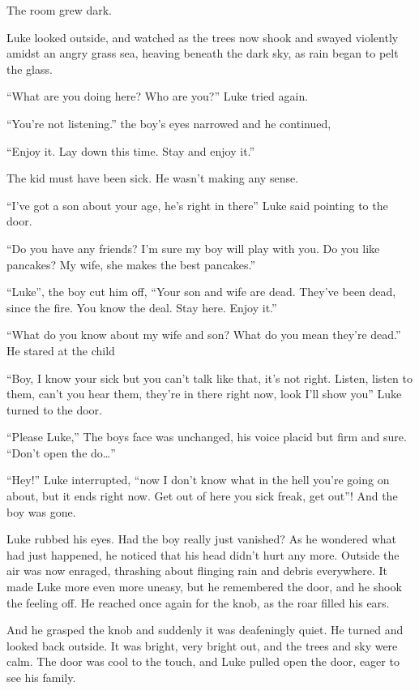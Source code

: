 The room grew dark.

Luke looked outside, and watched as the trees now shook and swayed
violently amidst an angry grass sea, heaving beneath the dark sky,
as rain began to pelt the glass.

``What are you doing here? Who are you?'' Luke tried
again.

``You're not listening.'' the boy's eyes
narrowed and he continued,

``Enjoy it. Lay down this time. Stay and enjoy
it.''



The kid must have been sick. He wasn't making any
sense.

``I've got a son about your age, he's right in
there'' Luke said pointing to the door.

``Do you have any friends? I'm sure my boy will play
with you. Do you like pancakes? My wife, she makes the best
pancakes.''

``Luke'', the boy cut him off, ``Your son and wife
are dead. They've been dead, since the fire. You know the
deal. Stay here. Enjoy it.''

``What do you know about my wife and son? What do you mean
they're dead.'' He stared at the child

``Boy, I know your sick but you can't talk like that,
it's not right. Listen, listen to them, can't you hear
them, they're in there right now, look I'll show
you'' Luke turned to the door.

``Please Luke,'' The boys face was unchanged, his voice
placid but firm and sure. ``Don't open the
do{\ldots}''

``Hey!'' Luke interrupted, ``now I don't know
what in the hell you're going on about, but it ends right
now. Get out of here you sick freak, get out''! And the boy
was gone.

Luke rubbed his eyes. Had the boy really just vanished? As he
wondered what had just happened, he noticed that his head
didn't hurt any more. Outside the air was now enraged,
thrashing about flinging rain and debris everywhere. It made Luke
more even more uneasy, but he remembered the door, and he shook the
feeling off. He reached once again for the knob, as the roar filled
his ears.

And he grasped the knob and suddenly it was deafeningly quiet. He
turned and looked back outside. It was bright, very bright out, and
the trees and sky were calm. The door was cool to the touch, and
Luke pulled open the door, eager to see his family.

